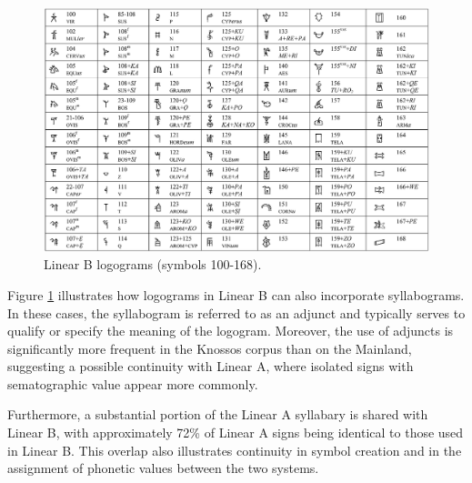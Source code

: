 \begin{figure}[H]
    \centering
    \includegraphics[width=1\textwidth]{Images/logos_1.jpg}
    \caption{Linear B logograms (symbols 100-168).}
    \label{fig:logos_1}
\end{figure}

Figure \ref{fig:logos_1} illustrates how logograms in Linear B can also incorporate syllabograms.
In these cases, the syllabogram is referred to as an adjunct and typically serves to qualify or specify the meaning of the logogram.
Moreover, the use of adjuncts is significantly more frequent in the Knossos corpus than on the Mainland, suggesting a possible continuity with Linear A, where isolated signs with sematographic value appear more commonly. \cite{salg-ch3}

Furthermore, a substantial portion of the Linear A syllabary is shared with Linear B, with approximately 72\% of Linear A signs being identical to those used in Linear B.
This overlap also illustrates continuity in symbol creation and in the assignment of phonetic values between the two systems.

